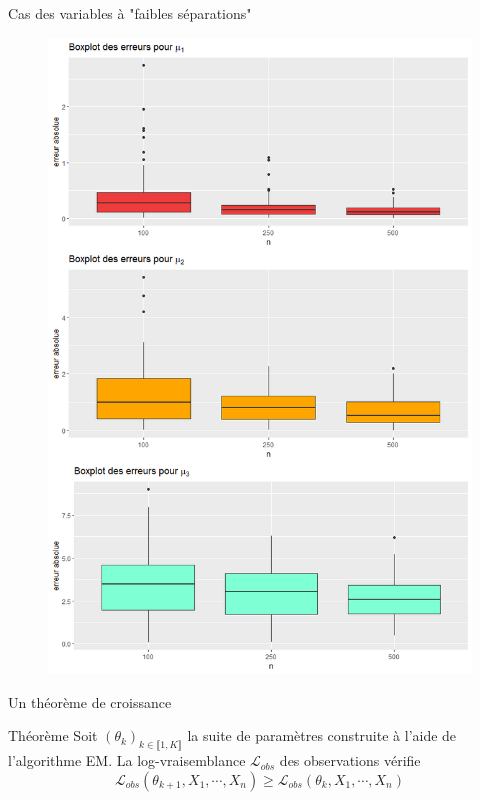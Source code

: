 \documentclass[11pt]{beamer}
\begin{document}
\begin{frame}{Cas des variables à "faibles séparations" }
\begin{figure}[htp]
{				\includegraphics[scale=0.18]{images/bad_mu.png}%
			}%
		\end{figure}
	\end{frame}
	
	\begin{frame}{Un théorème de croissance}
		\begin{block}{Théorème}
			Soit $(\theta_k)_{k\in \llbracket1, K\rrbracket}$ la suite de paramètres construite à l'aide de l'algorithme EM. \newline
La log-vraisemblance $\mathcal{L}_{obs}$ des observations vérifie 
		\[
		\mathcal{L}_{obs}(\theta_{k+1}, X_1, \cdots, X_n) \geq \mathcal{L}_{obs}(\theta_k, X_1, \cdots, X_n)
		\]
		\end{block}
	\end{frame}
\end{document}
